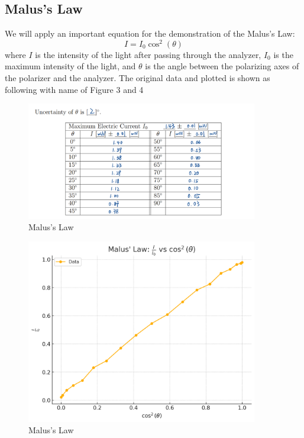 \documentclass[12pt, a4paper, oneside]{article}
\begin{document}
\subsection{Malus's Law}
\indent

We will apply an important equation for the demonstration of the Malus's Law:
\begin{equation*}
	I = I_0 \cos^2(\theta)
\end{equation*}
where \(I\) is the intensity of the light after passing through the analyzer, \(I_0\) is the maximum intensity of the light, and \(\theta\) is the angle between the polarizing axes of the polarizer and the analyzer.
The original data and plotted is shown as following with name of Figure 3 and 4
\begin{figure}
	\centering
	\includegraphics[width=0.9\textwidth]{Malu_Data.png}
	\caption{Malus's Law}
	\label{fig3}
\end{figure}
\begin{figure}
	\centering
	\includegraphics[width=0.9\textwidth]{Malu_Result.png}
	\caption{Malus's Law}
	\label{fig3}
\end{figure}
\end{document}
